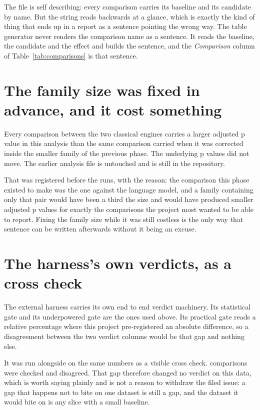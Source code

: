 The file is self describing: every comparison carries its baseline and its
candidate by name. But the string reads backwards at a glance, which is exactly
the kind of thing that ends up in a report as a sentence pointing the wrong way.
The table generator never renders the comparison name as a sentence. It reads the
baseline, the candidate and the effect and builds the sentence, and the
\emph{Comparison} column of Table~\ref{tab:comparisons} is that sentence.

\section{The family size was fixed in advance, and it cost something}

Every comparison between the two classical engines carries a larger adjusted p
value in this analysis than the same comparison carried when it was corrected
inside the smaller family of the previous phase. The underlying p values did not
move. The earlier analysis file is untouched and is still in the repository.

That was registered before the runs, with the reason: the comparison this phase
existed to make was the one against the language model, and a family containing
only that pair would have been a third the size and would have produced smaller
adjusted p values for exactly the comparisons the project most wanted to be able
to report. Fixing the family size while it was still costless is the only way
that sentence can be written afterwards without it being an excuse.

\section{The harness's own verdicts, as a cross check}

The external harness carries its own end to end verdict machinery. Its
statistical gate and its underpowered gate are the ones used above. Its practical
gate reads a relative percentage where this project pre-registered an absolute
difference, so a disagreement between the two verdict columns would be that gap
and nothing else.

It was run alongside on the same numbers as a visible cross check.
\vCrossCheckChecked{} comparisons were checked and \vCrossCheckDisagreements{}
disagreed. That gap therefore changed no verdict on this data, which is worth
saying plainly and is not a reason to withdraw the filed issue: a gap that happens
not to bite on one dataset is still a gap, and the dataset it would bite on is any
slice with a small baseline.

